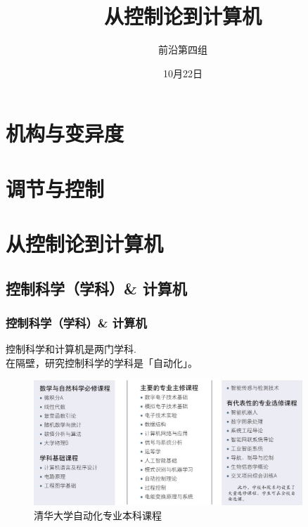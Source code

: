 \documentclass[12pt,AutoFakeBold,aspectratio=43,mathserif]{beamer}
\title{从控制论到计算机}
\author{前沿第四组}
\date{10月22日}
\begin{document}
    \begin{frame}
        \titlepage
    
    \end{frame}
    
    \section{机构与变异度}

    \section{调节与控制}

    \section{从控制论到计算机}
    \subsection{控制科学（学科）\& 计算机}
    \begin{frame}
        \frametitle{控制科学（学科）\& 计算机}
        \pause
        控制科学和计算机是两门学科. \\
        在隔壁，研究控制科学的学科是「自动化」。
        \begin{figure}[htbp]
            \caption{清华大学自动化专业本科课程}
            \setlength{\abovecaptionskip}{0.cm}
            \setlength{\belowcaptionskip}{-0.cm}
            \centering
            \vspace{-0.3cm}
            \setlength{\abovecaptionskip}{0.cm}
            \setlength{\belowcaptionskip}{-0.cm}
            \includegraphics[width=0.9\textwidth]{figures/3-1.jpg}
        \end{figure}
    \end{frame}
\end{document}
